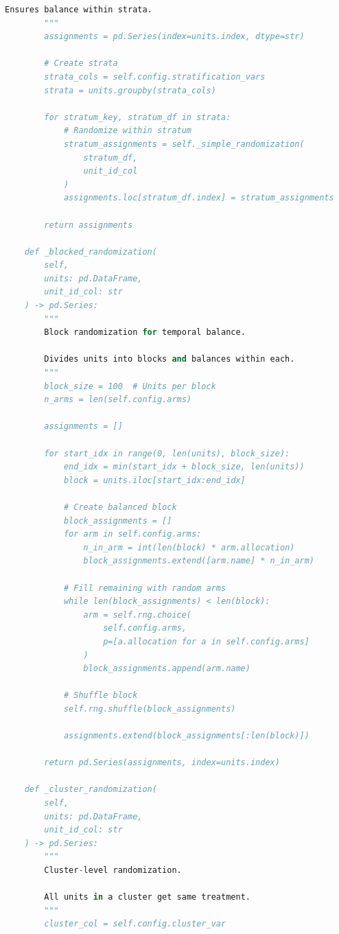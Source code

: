 \begin{lstlisting}[language=Python, caption={Comprehensive Experiment Design System}]
        Ensures balance within strata.
        """
        assignments = pd.Series(index=units.index, dtype=str)

        # Create strata
        strata_cols = self.config.stratification_vars
        strata = units.groupby(strata_cols)

        for stratum_key, stratum_df in strata:
            # Randomize within stratum
            stratum_assignments = self._simple_randomization(
                stratum_df,
                unit_id_col
            )
            assignments.loc[stratum_df.index] = stratum_assignments

        return assignments

    def _blocked_randomization(
        self,
        units: pd.DataFrame,
        unit_id_col: str
    ) -> pd.Series:
        """
        Block randomization for temporal balance.

        Divides units into blocks and balances within each.
        """
        block_size = 100  # Units per block
        n_arms = len(self.config.arms)

        assignments = []

        for start_idx in range(0, len(units), block_size):
            end_idx = min(start_idx + block_size, len(units))
            block = units.iloc[start_idx:end_idx]

            # Create balanced block
            block_assignments = []
            for arm in self.config.arms:
                n_in_arm = int(len(block) * arm.allocation)
                block_assignments.extend([arm.name] * n_in_arm)

            # Fill remaining with random arms
            while len(block_assignments) < len(block):
                arm = self.rng.choice(
                    self.config.arms,
                    p=[a.allocation for a in self.config.arms]
                )
                block_assignments.append(arm.name)

            # Shuffle block
            self.rng.shuffle(block_assignments)

            assignments.extend(block_assignments[:len(block)])

        return pd.Series(assignments, index=units.index)

    def _cluster_randomization(
        self,
        units: pd.DataFrame,
        unit_id_col: str
    ) -> pd.Series:
        """
        Cluster-level randomization.

        All units in a cluster get same treatment.
        """
        cluster_col = self.config.cluster_var


\end{lstlisting}
